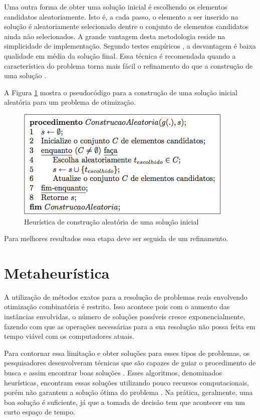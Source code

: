 Uma outra forma de obter uma solução inicial é escolhendo os elementos candidatos aleatoriamente. Isto é, a cada passo, o elemento a ser inserido na solução é aleatoriamente selecionado dentre o conjunto de elementos candidatos ainda não selecionados. A grande vantagem desta metodologia reside na simplicidade de implementação. Segundo testes empíricos , a desvantagem é baixa qualidade em média da solução final. Essa técnica é recomendada quando a característica do problema torna mais fácil o refinamento do que a construção de uma solução \citep{notasmarcone}. 

A Figura \ref{construcaoaleatoria} mostra o pseudocódigo para a construção de uma solução inicial aleatória para um problema de otimização.

\begin{figure}[ht]
	\centering
	\includegraphics[scale=0.7]{./img/construcaoaleatoria}
	\caption{Heurística de construção aleatória de uma solução inicial}
	\label{construcaoaleatoria}
\end{figure}

Para melhores resultados essa etapa deve ser seguida de um refinamento.

\section{Metaheurística}

A utilização de métodos exatos para a resolução de problemas reais envolvendo otimização combinatória é restrito. Isso acontece pois com o aumento das instâncias envolvidas, o número de soluções possíveis cresce exponencialmente, fazendo com que as operações necessárias para a sua resolução não possa feita em tempo viável com os computadores atuais.  

Para contornar essa limitação e obter soluções para esses tipos de problemas, os pesquisadores desenvolveram técnicas que são capazes de guiar o procedimento de busca e assim encontrar boas soluções \cite{maritan2009}. Esses algoritmos, denominados heurísticas, encontram essas soluções utilizando pouco recursos computacionais, porém não garantem a solução ótima do problema \cite{dias2006}. Na prática, geralmente, uma boa solução é suficiente, já que a tomada de decisão tem que acontecer em um curto espaço de tempo.

